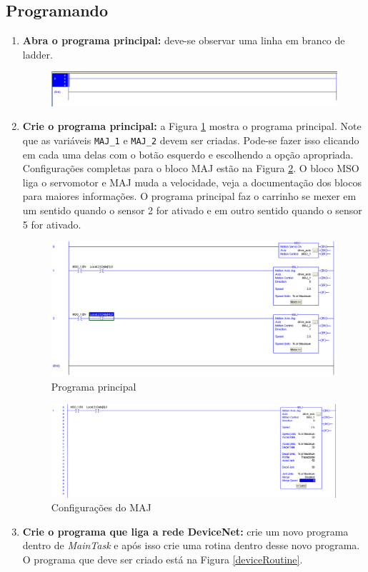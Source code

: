 \documentclass[a4paper,11pt]{scrartcl} %
\numberwithin{equation}{section} %
\numberwithin{figure}{section} %
\numberwithin{table}{section} %
\begin{document}
\subsection{Programando}
\begin{enumerate}
	\item \textbf{Abra o programa principal: } deve-se observar uma linha em branco de ladder.
	\begin{figure}[H]
       \centering
              \includegraphics[width=0.8\linewidth]{figures/software/step14}
          \end{figure}
     \item \textbf{Crie o programa principal: } a Figura \ref{mainRoutine} mostra o programa principal. Note que as variáveis \texttt{MAJ\_1} e \texttt{MAJ\_2} devem ser criadas. Pode-se fazer isso clicando em cada uma delas com o botão esquerdo e escolhendo a opção apropriada. Configurações completas para o bloco MAJ estão na Figura \ref{majConf}. O bloco MSO liga o servomotor e MAJ muda a velocidade, veja a documentação dos blocos para maiores informações. O programa principal faz o carrinho se mexer em um sentido quando o sensor 2 for ativado e em outro sentido quando o sensor 5 for ativado.
     \begin{figure}[H]
       \centering
              \includegraphics[width=0.9\linewidth]{figures/software/step16}
              \caption{Programa principal\label{mainRoutine}}
          \end{figure}
        \begin{figure}[H]
       \centering
              \includegraphics[width=0.9\linewidth]{figures/software/step15}
              \caption{Configurações do MAJ\label{majConf}}
          \end{figure}
     \item \textbf{Crie o programa que liga a rede DeviceNet: } crie um novo programa dentro de \textit{MainTask} e após isso crie uma rotina dentro desse novo programa. O programa que deve ser criado está na Figura \ref{deviceRoutine}.
     

\end{enumerate}
\end{document}
